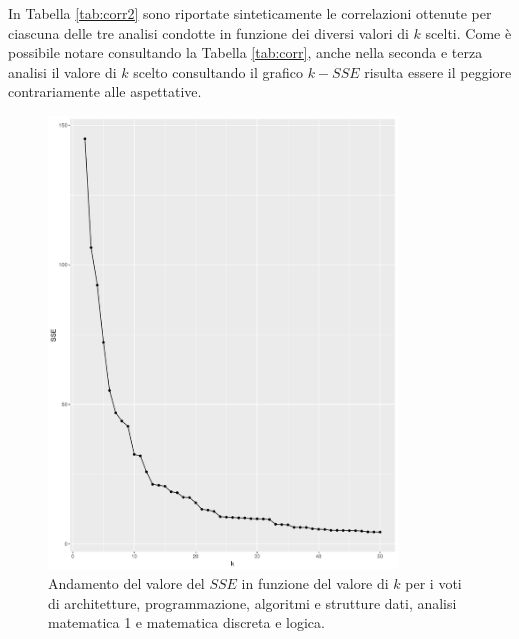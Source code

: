 \documentclass[12pt]{article}
\begin{document}
In Tabella \ref{tab:corr2} sono riportate sinteticamente le correlazioni ottenute per ciascuna delle tre analisi condotte in funzione dei diversi valori di $k$ scelti. Come è possibile notare consultando la Tabella \ref{tab:corr}, anche nella seconda e terza analisi il valore di $k$ scelto consultando il grafico $k-SSE$ risulta essere il peggiore contrariamente alle aspettative.

\begin{figure}[H]
	\centering
	\includegraphics[width=\textwidth, height=12cm,keepaspectratio]{img/k-sse-asd-arc-prg-an1-mdl.pdf}
	\caption{Andamento del valore del $SSE$ in funzione del valore di $k$ per i voti di architetture, programmazione, algoritmi e strutture dati, analisi matematica 1 e matematica discreta e logica.}
	\label{fig:k-sse2}
\end{figure}
\end{document}

